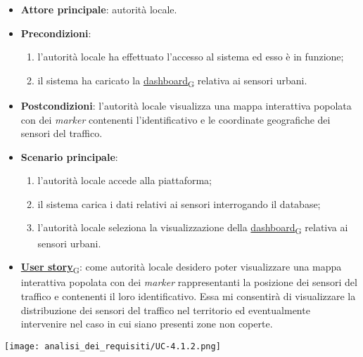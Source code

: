 \newpage
{}
\begin{itemize}
	\item \textbf{Attore principale}: autorità locale.
	\item \textbf{Precondizioni}:
	      \begin{enumerate}
		      \item l'autorità locale ha effettuato l'accesso al sistema ed esso è in funzione;
		      \item il sistema ha caricato la \href{https://7last.github.io/docs/pb/documentazione-interna/glossario\#dashboard}{dashboard\textsubscript{G}} relativa ai sensori urbani.
	      \end{enumerate}
	\item \textbf{Postcondizioni}: l'autorità locale visualizza una mappa interattiva popolata con dei \textit{marker} contenenti l'identificativo e le coordinate geografiche dei sensori del traffico.
	\item \textbf{Scenario principale}:
	      \begin{enumerate}
		      \item l'autorità locale accede alla piattaforma;
		      \item il sistema carica i dati relativi ai sensori interrogando il database;
		      \item l'autorità locale seleziona la visualizzazione della \href{https://7last.github.io/docs/pb/documentazione-interna/glossario\#dashboard}{dashboard\textsubscript{G}} relativa ai sensori urbani.
	      \end{enumerate}
	\item \href{https://7last.github.io/docs/pb/documentazione-interna/glossario\#user-story}{\textbf{User story}\textsubscript{G}}:
	      come autorità locale desidero poter visualizzare una mappa interattiva popolata con dei \textit{marker} rappresentanti la posizione dei sensori del traffico
	      e contenenti il loro identificativo. Essa mi consentirà di visualizzare la distribuzione dei sensori del traffico nel territorio ed eventualmente intervenire nel caso in cui siano presenti zone non coperte.
\end{itemize}
\begin{center}
	\texttt{[image: analisi\_dei\_requisiti/UC-4.1.2.png]}
\end{center}

